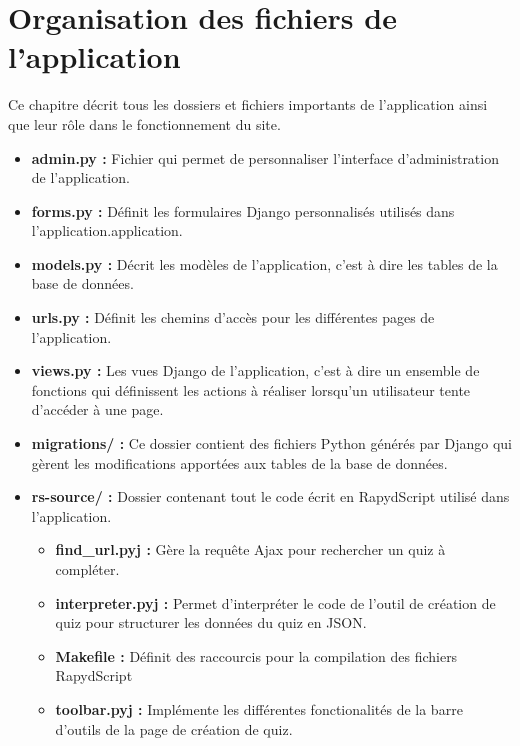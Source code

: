 \documentclass[a4paper,11pt,openany,oneside]{sphinxmanual}
\begin{document}
\section{Organisation des fichiers de l'application}
\label{global:organisation-des-fichiers-de-l-application}
Ce chapitre décrit tous les dossiers et fichiers importants de l'application ainsi que leur rôle dans le fonctionnement du site.
\begin{itemize}
\item {} 
\textbf{admin.py :} Fichier qui permet de personnaliser l'interface d'administration de l'application.

\item {} 
\textbf{forms.py :} Définit les formulaires Django personnalisés utilisés dans l'application.application.

\item {} 
\textbf{models.py :} Décrit les modèles de l'application, c'est à dire les tables de la base de données.

\item {} 
\textbf{urls.py :} Définit les chemins d'accès pour les différentes pages de l'application.

\item {} 
\textbf{views.py :} Les vues Django de l'application, c'est à dire un ensemble de fonctions qui définissent les actions à réaliser lorsqu'un utilisateur tente d'accéder à une page.

\item {} 
\textbf{migrations/ :} Ce dossier contient des fichiers Python générés par Django qui gèrent les modifications apportées aux tables de la base de données.

\item {} 
\textbf{rs-source/ :} Dossier contenant tout le code écrit en RapydScript utilisé dans l'application.
\begin{itemize}
\item {} 
\textbf{find\_url.pyj :} Gère la requête Ajax pour rechercher un quiz à compléter.

\item {} 
\textbf{interpreter.pyj :} Permet d'interpréter le code de l'outil de création de quiz pour structurer les données du quiz en JSON.

\item {} 
\textbf{Makefile :} Définit des raccourcis pour la compilation des fichiers RapydScript

\item {} 
\textbf{toolbar.pyj :} Implémente les différentes fonctionalités de la barre d'outils de la page de création de quiz.


\end{itemize}
\end{itemize}
\end{document}
